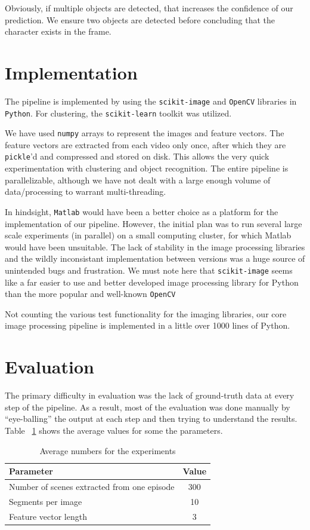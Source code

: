 \documentclass[10pt,twocolumn,letterpaper]{article}
\begin{document}
Obviously, if multiple objects are detected, that increases the
confidence of our prediction. We ensure two objects are detected
before concluding that the character exists in the frame.

\section{Implementation}
The pipeline is implemented by using the \texttt{scikit-image} and
\texttt{OpenCV} libraries in \texttt{Python}. For clustering, the
\texttt{scikit-learn} toolkit was utilized.

We have used \texttt{numpy} arrays to represent the images and feature
vectors. The feature vectors are extracted from each video only once,
after which they are \texttt{pickle}'d and compressed and stored on
disk. This allows the very quick experimentation with clustering and
object recognition. The entire pipeline is parallelizable, although
we have not dealt with a large enough volume of data/processing to
warrant multi-threading.

In hindsight, \texttt{Matlab} would have been a better choice as a
platform for the implementation of our pipeline. However, the initial
plan was to run several large scale experiments (in parallel) on a
small computing cluster, for which Matlab would have been
unsuitable. The lack of stability in the image processing libraries
and the wildly inconsistant implementation between versions was a huge
source of unintended bugs and frustration. We must note here that
\texttt{scikit-image} seems like a far easier to use and better
developed image processing library for Python than the more popular
and well-known \texttt{OpenCV}

Not counting the various test functionality for the imaging libraries,
our core image processing pipeline is implemented in a little over
1000 lines of Python.


\section{Evaluation}

The primary difficulty in evaluation was the lack of ground-truth data
at every step of the pipeline. As a result, most of the evaluation was
done manually by ``eye-balling'' the output at each step and then
trying to understand the results. Table ~\ref{params} shows the
average values for some the parameters.

\begin{table}
\begin{tabular}{|l|c|}
  \hline
  Parameter & Value \\
  \hline
Number of scenes extracted from one episode & 300  \\

Segments per image & 10 \\

Feature vector length &  3  \\
  
  \hline
\end{tabular}
\caption{Average numbers for the experiments}
\label{params}
\end{table}
\end{document}
